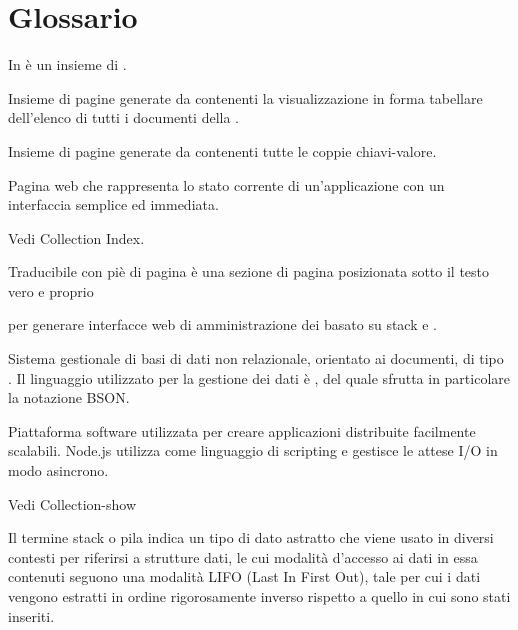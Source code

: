 \clearpage
\section{Glossario}


In  è un insieme di .

Insieme di pagine generate da \ProjectName{} contenenti la visualizzazione in forma tabellare dell'elenco di tutti i documenti della  .

Insieme di pagine generate da \ProjectName{} contenenti tutte le coppie chiavi-valore.


Pagina web che rappresenta lo stato corrente di un'applicazione con un interfaccia semplice ed immediata.

Vedi Collection Index.

Traducibile con piè di pagina è una sezione di pagina posizionata sotto il testo vero e proprio


 per generare interfacce web di amministrazione dei  basato su stack  e .


Sistema gestionale di basi di dati non relazionale, orientato ai documenti, di tipo . Il linguaggio utilizzato per la gestione dei dati è , del quale sfrutta in particolare la notazione BSON.


Piattaforma software utilizzata per creare applicazioni distribuite facilmente scalabili.
Node.js utilizza  come linguaggio di scripting e gestisce le attese I/O in modo asincrono.



Vedi Collection-show

Il termine stack o pila indica un tipo di dato astratto che viene usato in diversi contesti per riferirsi a strutture dati, le cui modalità d'accesso ai dati in essa contenuti seguono una modalità LIFO (Last In First Out), tale per cui i dati vengono estratti in ordine rigorosamente inverso rispetto a quello in cui sono stati inseriti.